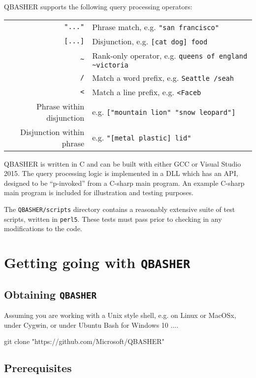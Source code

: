 \documentclass{article}
\newcommand{\projectName}{\texttt{QBASHER}}
\begin{document}
    

QBASHER supports the following query processing operators:

\vspace{3mm}
\begin{tabular}{|r|l|}
  \hline
\texttt{"..."}& Phrase match, e.g. \texttt{"san francisco"} \\
\texttt{[...]}& Disjunction, e.g. \texttt{[cat dog] food}\\
\texttt{\~}& Rank-only operator, e.g. \verb|queens of england ~victoria|\\
\texttt{/}& Match a word prefix, e.g. \texttt{Seattle /seah}\\
\verb|<|& Match a line prefix, e.g. \texttt{<Faceb}\\
Phrase within disjunction& e.g. \texttt{["mountain lion" "snow
    leopard"]} \\
Disjunction within phrase& e.g. \texttt{"[metal plastic] lid"}\\
\hline
\end{tabular}
\vspace{3mm}

QBASHER is written in C and can be built with either GCC or Visual
Studio 2015.  The query processing logic is implemented in a DLL
which has an API, designed to be ``p-invoked'' from a C-sharp main program.
An example C-sharp main program is included for illustration and testing
purposes.

The \texttt{QBASHER/scripts} directory contains a reasonably
extensive suite of test scripts, written in \texttt{perl5}.  These
tests must pass prior to checking in any modifications to the code.


\section{Getting going with \projectName}

\subsection{Obtaining \projectName}

Assuming you are working with a Unix style shell, e.g. on Linux or MacOSx,
under Cygwin, or under Ubuntu Bash for Windows 10 ....

\begin{verb}
git clone "https://github.com/Microsoft/QBASHER"
\end{verb}


\subsection{Prerequisites}
\end{document}
